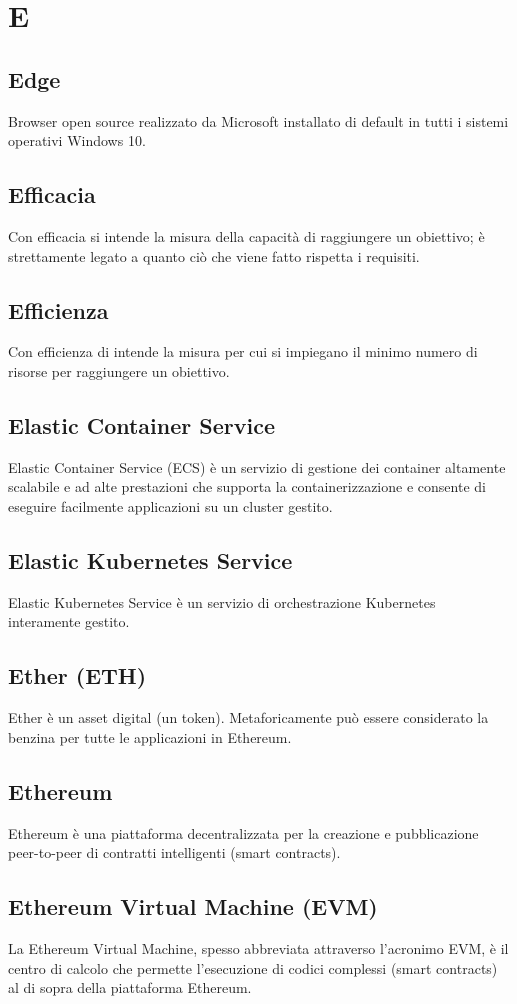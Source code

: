 \newpage \section{E}
\subsection{Edge}  Browser open source realizzato da Microsoft installato di default in tutti i sistemi operativi Windows 10.
\subsection{Efficacia}  Con efficacia si intende la misura della capacità di raggiungere un obiettivo; è strettamente legato a quanto ciò che viene fatto rispetta i requisiti.
\subsection{Efficienza}  Con efficienza di intende la misura per cui si impiegano il minimo numero di risorse per raggiungere un obiettivo.
\subsection{Elastic Container Service}  Elastic Container Service (ECS) è un servizio di gestione dei container altamente scalabile e ad alte prestazioni che supporta la containerizzazione e consente di eseguire facilmente applicazioni su un cluster gestito.
\subsection{Elastic Kubernetes Service}  Elastic Kubernetes Service è un servizio di orchestrazione Kubernetes interamente gestito.
\subsection{Ether (ETH)}  Ether è un asset digital (un token). Metaforicamente può essere considerato la benzina per tutte le applicazioni in Ethereum.
\subsection{Ethereum}  Ethereum è una piattaforma decentralizzata per la creazione e pubblicazione peer-to-peer di contratti intelligenti (smart contracts).
\subsection{Ethereum Virtual Machine (EVM)}  La Ethereum Virtual Machine, spesso abbreviata attraverso l’acronimo EVM, è il centro di calcolo che permette l’esecuzione di codici complessi (smart contracts) al di sopra della piattaforma Ethereum.
